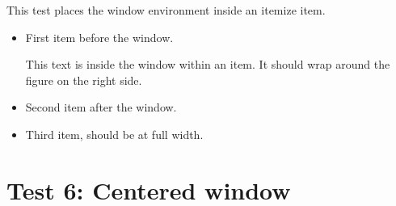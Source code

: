 This test places the window environment inside an itemize item.

\begin{itemize}
  \item First item before the window.

  \begin{window}
    This text is inside the window within an item. It should wrap
    around the figure on the right side.
    \lipsum[9][1-3]
  \end{window}

  \item Second item after the window.
  \item Third item, should be at full width.
\end{itemize}

\section{Test 6: Centered window}

\begin{window}
  \lipsum[7]
\end{window}


